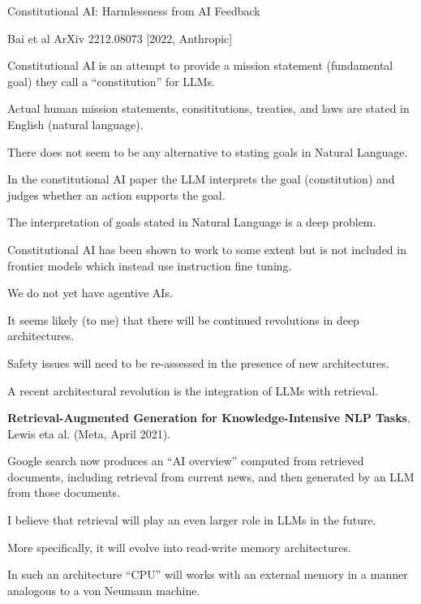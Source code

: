 {
\centerline{\huge Constitutional AI: Harmlessness from AI Feedback}
\centerline{\huge Bai et al ArXiv 2212.08073 [2022, Anthropic]}

\vfill
Constitutional AI is an attempt to provide a mission  statement (fundamental goal) they call a ``constitution'' for LLMs.

\vfill
Actual human mission statements, consititutions, treaties, and laws are stated in English (natural language).

\vfil
There does not seem to be any alternative to stating goals in Natural Language.

\vfill
In the constitutional AI paper the LLM interprets the goal (constitution) and judges whether an action supports the goal.



The interpretation of goals stated in Natural Language is a deep problem.

\vfill
Constitutional AI has been shown to work to some extent but is not included in frontier models which instead use instruction fine tuning.


We do not yet have agentive AIs.

\vfill
It seems likely (to me) that there will be continued revolutions in deep architectures.

\vfill
Safety issues will need to be re-assessed in the presence of new architectures.


A recent architectural revolution is the integration of LLMs with retrieval.

\vfill
{\bf Retrieval-Augmented Generation for Knowledge-Intensive NLP Tasks}, Lewis eta al. (Meta, April 2021).

\vfill
Google search now produces an ``AI overview'' computed from retrieved documents, including retrieval from current news,
and then generated by an LLM from those documents.


I believe that retrieval will play an even larger role in LLMs in the future.

\vfill
More specifically, it will evolve into read-write memory architectures.

\vfill
In such an architecture ``CPU'' will works with an external memory in a manner analogous to a von Neumann machine.

}
